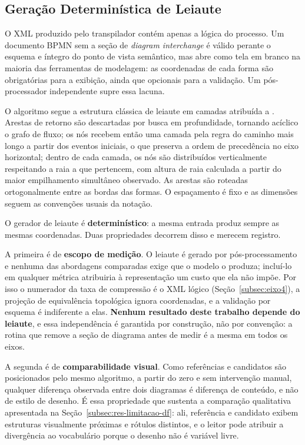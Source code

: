 \subsection{Geração Determinística de Leiaute}
\label{subsec:layout}

O XML produzido pelo transpilador contém apenas a lógica do processo. Um documento BPMN sem a seção de \textit{diagram interchange} é válido perante o esquema e íntegro do ponto de vista semântico, mas abre como tela em branco na maioria das ferramentas de modelagem: as coordenadas de cada forma são obrigatórias para a exibição, ainda que opcionais para a validação. Um pós-processador independente supre essa lacuna.

O algoritmo segue a estrutura clássica de leiaute em camadas atribuída a . Arestas de retorno são descartadas por busca em profundidade, tornando acíclico o grafo de fluxo; os nós recebem então uma camada pela regra do caminho mais longo a partir dos eventos iniciais, o que preserva a ordem de precedência no eixo horizontal; dentro de cada camada, os nós são distribuídos verticalmente respeitando a raia a que pertencem, com altura de raia calculada a partir do maior empilhamento simultâneo observado. As arestas são roteadas ortogonalmente entre as bordas das formas. O espaçamento é fixo e as dimensões seguem as convenções usuais da notação.

O gerador de leiaute é \textbf{determinístico}: a mesma entrada produz sempre as mesmas coordenadas. Duas propriedades decorrem disso e merecem registro.

A primeira é de \textbf{escopo de medição}. O leiaute é gerado por pós-processamento e nenhuma das abordagens comparadas exige que o modelo o produza; incluí-lo em qualquer métrica atribuiria à representação um custo que ela não impõe. Por isso o numerador da taxa de compressão é o XML lógico (Seção~\ref{subsec:eixo4}), a projeção de equivalência topológica ignora coordenadas, e a validação por esquema é indiferente a elas. \textbf{Nenhum resultado deste trabalho depende do leiaute}, e essa independência é garantida por construção, não por convenção: a rotina que remove a seção de diagrama antes de medir é a mesma em todos os eixos.

A segunda é de \textbf{comparabilidade visual}. Como referências e candidatos são posicionados pelo mesmo algoritmo, a partir do zero e sem intervenção manual, qualquer diferença observada entre dois diagramas é diferença de conteúdo, e não de estilo de desenho. É essa propriedade que sustenta a comparação qualitativa apresentada na Seção~\ref{subsec:res-limitacao-df}: ali, referência e candidato exibem estruturas visualmente próximas e rótulos distintos, e o leitor pode atribuir a divergência ao vocabulário porque o desenho não é variável livre.

